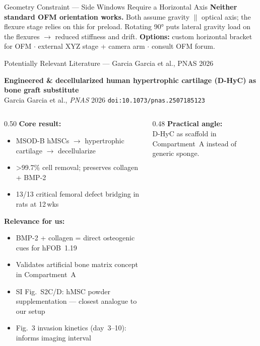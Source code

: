 \documentclass[aspectratio=169,11pt]{beamer}
\begin{document}
\begin{frame}{Geometry Constraint --- Side Windows Require a Horizontal Axis}
  \vspace{0.2em}
  \footnotesize
  \alert{\textbf{Neither standard OFM orientation works.}}
  Both assume gravity $\parallel$ optical axis; the flexure stage relies on this for preload.
  Rotating 90° puts lateral gravity load on the flexures $\to$ reduced stiffness and drift.
  \textbf{Options:} custom horizontal bracket for OFM $\cdot$ external XYZ stage + camera arm $\cdot$ consult OFM forum.

\end{frame}

\begin{frame}[shrink=5]{Potentially Relevant Literature --- Garcia Garcia et al., PNAS 2026}

  \small\textbf{Engineered \& decellularized human hypertrophic cartilage (D-HyC) as bone graft substitute}\\
  \footnotesize Garcia Garcia et al., \textit{PNAS} 2026 \quad \texttt{doi:10.1073/pnas.2507185123}

  \vspace{0.3em}

  \begin{columns}[T]
    \begin{column}{0.50\textwidth}
      \footnotesize\textbf{Core result:}\vspace{0.1em}
      \begin{itemize}\itemsep=0pt
        \item MSOD-B hMSCs $\to$ hypertrophic cartilage $\to$ decellularize
        \item \textgreater99.7\% cell removal; preserves collagen + BMP-2
        \item 13/13 critical femoral defect bridging in rats at 12\,wks
      \end{itemize}
      \vspace{0.2em}
      \footnotesize\textbf{Relevance for us:}\vspace{0.1em}
      \begin{itemize}\itemsep=0pt
        \item BMP-2 + collagen = direct osteogenic cues for hFOB~1.19
        \item Validates artificial bone matrix concept in Compartment~A
        \item SI Fig.~S2C/D: hMSC powder supplementation --- closest analogue to our setup
        \item Fig.~3 invasion kinetics (day~3--10): informs imaging interval
      \end{itemize}
    \end{column}
    \begin{column}{0.48\textwidth}
      \footnotesize\textbf{Practical angle:}\vspace{0.1em}\\
      D-HyC as scaffold in Compartment~A instead of generic sponge.


\end{column}
\end{columns}
\end{frame}
\end{document}

